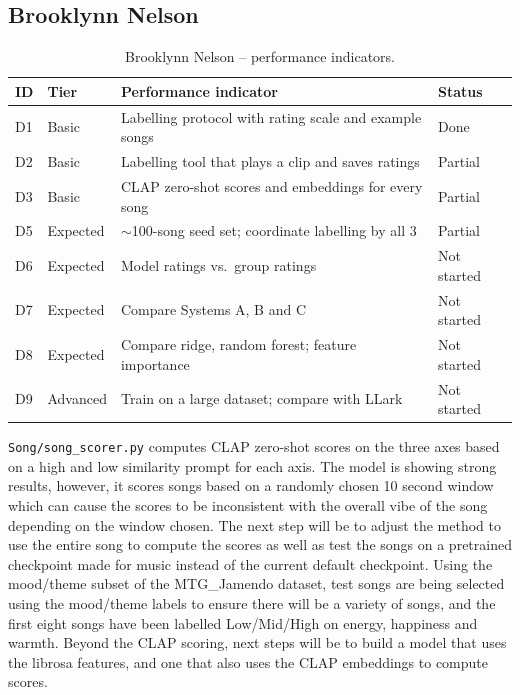 \subsection{Brooklynn Nelson}\label{sec:status_brooklynn}

\begin{table}[h]
\centering\footnotesize
\begin{tabular}{@{}llp{}l@{}}
\toprule
ID & Tier & Performance indicator & Status \\
\midrule
D1 & Basic    & Labelling protocol with rating scale and example songs & Done \\
D2 & Basic    & Labelling tool that plays a clip and saves ratings & Partial \\
D3 & Basic    & CLAP zero-shot scores and embeddings for every song & Partial \\
D5 & Expected & $\sim$100-song seed set; coordinate labelling by all 3 & Partial \\
D6 & Expected & Model ratings vs.\ group ratings & Not started \\
D7 & Expected & Compare Systems A, B and C & Not started \\
D8 & Expected & Compare ridge, random forest; feature importance & Not started \\
D9 & Advanced & Train on a large dataset; compare with LLark & Not started \\
\bottomrule
\end{tabular}
\caption{Brooklynn Nelson -- performance indicators.}
\label{tab:pi_brooklynn}
\end{table}


\texttt{Song/song\_scorer.py} computes CLAP zero-shot scores on the three axes based on a 
high and low similarity prompt for each axis. The model is showing strong results,
however, it scores songs based on a randomly chosen 10 second window which can cause 
the scores to be inconsistent with the overall vibe of the song depending on the window chosen. 
The next step will be to adjust the method to use the entire song to compute the scores 
as well as test the songs on a pretrained checkpoint made for music instead of the 
current default checkpoint. Using the mood/theme subset of the MTG\_Jamendo dataset, test 
songs are being selected using the mood/theme labels to ensure there will be a variety 
of songs, and the first eight songs have been labelled Low/Mid/High on energy, 
happiness and warmth. Beyond the CLAP scoring, next steps will be to build a model
that uses the librosa features, and one that also uses the CLAP embeddings to compute scores.

